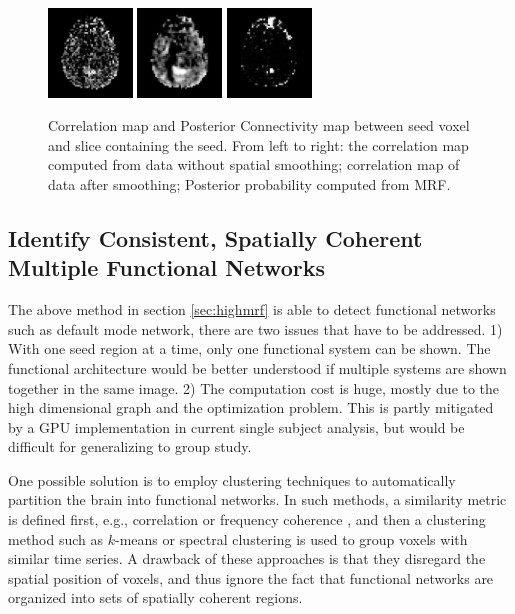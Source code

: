 \documentclass[12pt]{article}
\begin{document}
\begin{figure}[thb]
  \centering
  \includegraphics[width = 0.2\textwidth]{figures/no_overlay/R1_corr_nosmooth}
  \includegraphics[width = 0.2\textwidth]{figures/no_overlay/R1_corr_smooth}
  \includegraphics[width = 0.2\textwidth]{figures/no_overlay/R1_mrf}
  \caption{Correlation map and Posterior Connectivity map between seed voxel
    and slice containing the seed. From left to right: the correlation
    map computed from data without spatial smoothing;  correlation map of
    data after smoothing; Posterior probability computed from MRF.}
  \label{fig:mrfvssmoothing}
\end{figure}

\subsection{Identify Consistent, Spatially Coherent Multiple Functional Networks}

The above method in section \ref{sec:highmrf} is able to detect functional
networks such as default mode network, there are two issues that have to be
addressed. 1) With one seed region at a time, only one functional system can be
shown. The functional architecture would be better understood if multiple
systems are shown together in the same image. 2) The computation cost is huge,
mostly due to the high dimensional graph and the optimization problem.  This is
partly mitigated by a GPU implementation in current single subject analysis, but
would be difficult for generalizing to group study.

One possible solution is to employ clustering techniques to automatically
partition the brain into functional networks. In such methods, a similarity
metric is defined first, e.g., correlation \cite{5074650} or frequency coherence
\cite{thirion2006detection}, and then a clustering method such as $k$-means or
spectral clustering is used to group voxels with similar time series. A drawback
of these approaches is that they disregard the spatial position of voxels, and
thus ignore the fact that functional networks are organized into sets of
spatially coherent regions.
\end{document}
